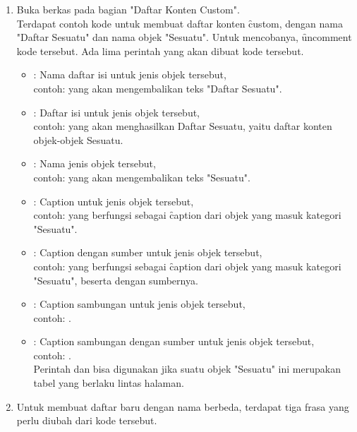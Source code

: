 \begin{enumerate}
	\item Buka berkas  pada bagian "Daftar Konten Custom". \\
	Terdapat contoh kode untuk membuat daftar konten \f{custom}, dengan nama "Daftar Sesuatu" dan nama objek "Sesuatu".
	Untuk mencobanya, \f{uncomment} kode tersebut. Ada lima perintah yang akan dibuat kode tersebut.
	\begin{itemize}
		\item {}:
			Nama daftar isi untuk jenis objek tersebut, \\
			contoh:  yang akan mengembalikan teks "Daftar Sesuatu".
		\item {}:
			Daftar isi untuk jenis objek tersebut, \\
			contoh:  yang akan menghasilkan Daftar Sesuatu, yaitu daftar konten objek-objek Sesuatu.
		\item {}: Nama jenis objek tersebut, \\
			contoh:  yang akan mengembalikan teks "Sesuatu".
		\item {}: Caption untuk jenis objek tersebut, \\
			contoh:  yang berfungsi sebagai \f{caption} dari objek yang masuk kategori "Sesuatu".
		\item {}: Caption dengan sumber untuk jenis objek tersebut, \\
			contoh:  yang berfungsi sebagai \f{caption} dari objek yang masuk kategori "Sesuatu", beserta dengan sumbernya.
		\item {}: Caption sambungan untuk jenis objek tersebut, \\
			contoh: .
		\item {}: Caption sambungan dengan sumber untuk jenis objek tersebut, \\
			contoh: . \\
		Perintah  dan  bisa digunakan jika suatu objek "Sesuatu" ini merupakan tabel yang berlaku lintas halaman.
	\end{itemize}
	\item Untuk membuat daftar baru dengan nama berbeda, terdapat tiga frasa yang perlu diubah dari kode tersebut.

\end{enumerate}
